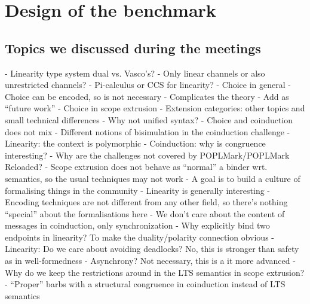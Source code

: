 \documentclass[runningheads]{llncs}
\begin{document}
\section{Design of the benchmark}\label{sec:design-discussion}
\subsection{Topics we discussed during the meetings}
- Linearity type system dual vs. Vasco's?
- Only linear channels or also unrestricted channels?
- Pi-calculus or CCS for linearity?
- Choice in general
  - Choice can be encoded, so is not necessary
  - Complicates the theory
  - Add as ``future work''
- Choice in scope extrusion
- Extension categories: other topics and small technical differences
- Why not unified syntax?
  - Choice and coinduction does not mix
- Different notions of bisimulation in the coinduction challenge
- Linearity: the context is polymorphic
- Coinduction: why is congruence interesting?
- Why are the challenges not covered by POPLMark/POPLMark Reloaded?
- Scope extrusion does not behave as ``normal'' a binder wrt. semantics, so the usual techniques may not work
- A goal is to build a culture of formalising things in the community
- Linearity is generally interesting
- Encoding techniques are not different from any other field, so there's nothing ``special'' about the formalisations here
- We don't care about the content of messages in coinduction, only synchronization
- Why explicitly bind two endpoints in linearity? To make the duality/polarity connection obvious
- Linearity: Do we care about avoiding deadlocks? No, this is stronger than safety as in well-formedness
- Asynchrony? Not necessary, this is a it more advanced
- Why do we keep the restrictions around in the LTS semantics in scope extrusion?
- ``Proper'' barbs with a structural congruence in coinduction instead of LTS semantics
\end{document}
